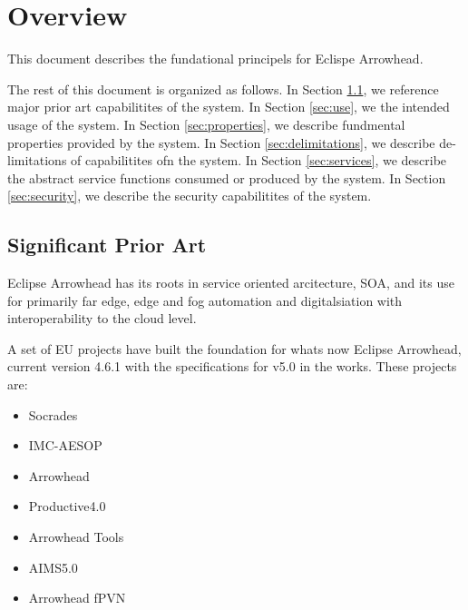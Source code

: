 \documentclass[a4paper]{arrowhead}
\begin{document}
\section{Overview}
\label{sec:overview}
This document describes the fundational principels for Eclispe
Arrowhead. 

The rest of this document is organized as follows.
In Section \ref{sec:prior_art}, we reference major prior art capabilitites
of the system.
In Section \ref{sec:use}, we the intended usage of the system.
In Section \ref{sec:properties}, we describe fundmental properties
provided by the system.
In Section \ref{sec:delimitations}, we describe de-limitations of capabilitites
ofn the system.
In Section \ref{sec:services}, we describe the abstract service
functions consumed or produced by the system.
In Section \ref{sec:security}, we describe the security capabilitites
of the system.


\subsection{Significant Prior Art}
\label{sec:prior_art}

Eclipse Arrowhead has its roots in service oriented arcitecture, SOA,
and its use for primarily far edge, edge and fog automation and
digitalsiation with interoperability to the cloud level.

A set of EU projects have built the foundation for whats now Eclipse
Arrowhead, current version 4.6.1 with the specifications for v5.0 in
the works. These projects are:
\begin{itemize}
\item Socrades
\item IMC-AESOP
\item Arrowhead
\item Productive4.0
\item Arrowhead Tools
\item AIMS5.0
\item Arrowhead fPVN
\end{itemize}
\end{document}
